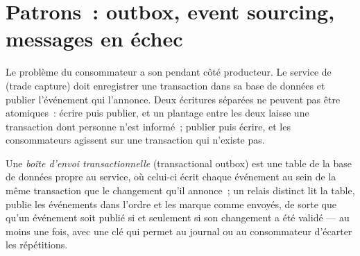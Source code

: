 \section{Patrons~: outbox, event sourcing, messages en échec}

Le problème du consommateur a son pendant côté producteur. Le service de  (trade capture) doit enregistrer une transaction dans sa base de données et publier
l'événement qui l'annonce. Deux écritures séparées ne peuvent pas être atomiques~: écrire puis publier, et un plantage entre les deux laisse une transaction dont personne n'est informé~;
publier puis écrire, et les consommateurs agissent sur une transaction qui n'existe pas.

\begin{definition}\label{def:pl:messaging-and-event-driven-architecture:outbox}
Une \emph{boîte d'envoi transactionnelle} (transactional outbox) est une table de la base de données propre au service, où celui-ci écrit chaque événement au sein
de la même transaction que le changement qu'il annonce~; un relais distinct lit la table, publie les événements dans l'ordre et les marque comme envoyés, de sorte que
qu'un événement soit publié si et seulement si son changement a été validé --- au moins une fois, avec une clé qui permet au journal ou au consommateur d'écarter les
répétitions.
\end{definition}

